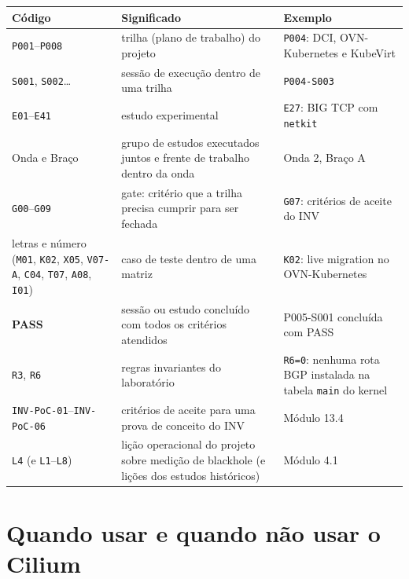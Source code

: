 \documentclass[12pt,openany,oneside,a4paper,chapter=TITLE,english,brazil]{abntex2}
\begin{document}
\begin{quadro}[!htbp]
\caption{Códigos do projeto usados no guia}
\footnotesize
\begin{tabularx}{\textwidth}{|>{\raggedright\arraybackslash\hsize=0.768\hsize}X|>{\raggedright\arraybackslash\hsize=1.281\hsize}X|>{\raggedright\arraybackslash\hsize=0.951\hsize}X|}
\hline
\textbf{Código} & \textbf{Significado} & \textbf{Exemplo} \\
\hline
\texttt{P001}--\texttt{P008} & trilha (plano de trabalho) do projeto & \texttt{P004}: DCI, OVN-Kubernetes e KubeVirt \\
\hline
\texttt{S001}, \texttt{S002}\ldots{} & sessão de execução dentro de uma trilha & \texttt{P004-{}\allowbreak{}S003} \\
\hline
\texttt{E01}--\texttt{E41} & estudo experimental & \texttt{E27}: BIG TCP com \texttt{netkit} \\
\hline
Onda e Braço & grupo de estudos executados juntos e frente de trabalho dentro da onda & Onda 2, Braço A \\
\hline
\texttt{G00}--\texttt{G09} & gate: critério que a trilha precisa cumprir para ser fechada & \texttt{G07}: critérios de aceite do INV \\
\hline
letras e número (\texttt{M01}, \texttt{K02}, \texttt{X05},
\texttt{V07-{}\allowbreak{}A}, \texttt{C04}, \texttt{T07}, \texttt{A08},
\texttt{I01}) & caso de teste dentro de uma matriz & \texttt{K02}: live migration no OVN-Kubernetes \\
\hline
\textbf{PASS} & sessão ou estudo concluído com todos os critérios atendidos & P005-S001 concluída com PASS \\
\hline
\texttt{R3}, \texttt{R6} & regras invariantes do laboratório & \texttt{R6=\allowbreak{}0}: nenhuma rota BGP instalada na tabela
\texttt{main} do kernel \\
\hline
\texttt{INV-{}\allowbreak{}Po\allowbreak{}C-{}\allowbreak{}01}--\texttt{INV-{}\allowbreak{}Po\allowbreak{}C-{}\allowbreak{}06} & critérios de aceite para uma prova de conceito do INV & Módulo 13.4 \\
\hline
\texttt{L4} (e \texttt{L1}--\texttt{L8}) & lição operacional do projeto sobre medição de blackhole (e lições dos
estudos históricos) & Módulo 4.1 \\
\hline
\end{tabularx}
\end{quadro}

\section*{Quando usar e quando não usar o Cilium}\label{quando-usar-e-quando-nuxe3o-usar-o-cilium}
\end{document}
